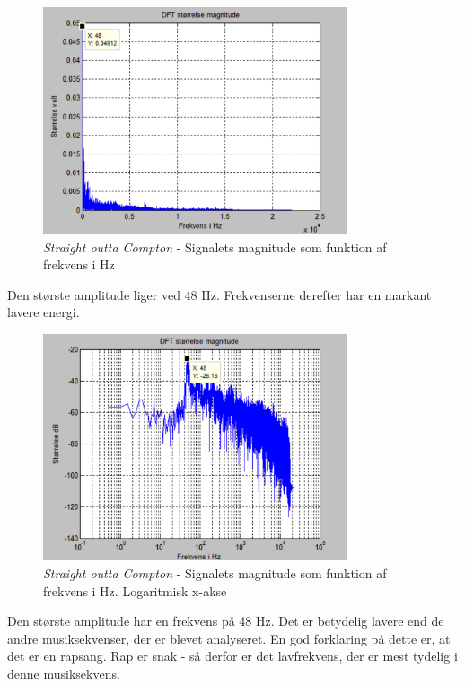 \begin{figure}[H]
	\centering
	\includegraphics[width=0.8\textwidth]{Figurer/Snip20151001_17}
	\caption{\textit{Straight outta Compton} - Signalets magnitude som funktion af frekvens i Hz}
\end{figure}

Den største amplitude liger ved 48 Hz. Frekvenserne derefter har en markant lavere energi.

\begin{figure}[H]
	\centering
	\includegraphics[width=0.8\textwidth]{Figurer/Snip20151001_18}
	\caption{\textit{Straight outta Compton} - Signalets magnitude som funktion af frekvens i Hz. Logaritmisk x-akse}
\end{figure} 

Den største amplitude har en frekvens på 48 Hz. Det er betydelig lavere end de andre musiksekvenser, der er blevet analyseret. En god forklaring på dette er, at det er en rapsang. Rap er snak - så derfor er det lavfrekvens, der er mest tydelig i denne musiksekvens.  

